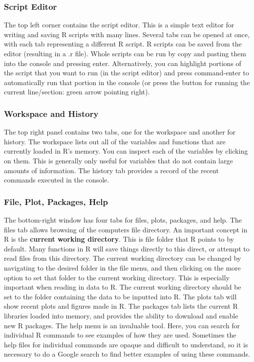 \documentclass[
]{book}
\begin{document}
\hypertarget{script-editor}{%
\subsubsection{Script Editor}\label{script-editor}}

The top left corner contains the script editor. This is a simple text editor for writing and saving R scripts with many lines. Several tabs can be opened at once, with each tab representing a different R script. R scripts can be saved from the editor (resulting in a .r file). Whole scripts can be run by copy and pasting them into the console and pressing enter. Alternatively, you can highlight portions of the script that you want to run (in the script editor) and press command-enter to automatically run that portion in the console (or press the button for running the current line/section: green arrow pointing right).

\hypertarget{workspace-and-history}{%
\subsubsection{Workspace and History}\label{workspace-and-history}}

The top right panel contains two tabs, one for the workspace and another for history. The workspace lists out all of the variables and functions that are currently loaded in R's memory. You can inspect each of the variables by clicking on them. This is generally only useful for variables that do not contain large amounts of information. The history tab provides a record of the recent commands executed in the console.

\hypertarget{file-plot-packages-help}{%
\subsubsection{File, Plot, Packages, Help}\label{file-plot-packages-help}}

The bottom-right window has four tabs for files, plots, packages, and help. The files tab allows browsing of the computers file directory. An important concept in R is the \textbf{current working directory}. This is file folder that R points to by default. Many functions in R will save things directly to this direct, or attempt to read files from this directory. The current working directory can be changed by navigating to the desired folder in the file menu, and then clicking on the more option to set that folder to the current working directory. This is especially important when reading in data to R. The current working directory should be set to the folder containing the data to be inputted into R. The plots tab will show recent plots and figures made in R. The packages tab lists the current R libraries loaded into memory, and provides the ability to download and enable new R packages. The help menu is an invaluable tool. Here, you can search for individual R commands to see examples of how they are used. Sometimes the help files for individual commands are opaque and difficult to understand, so it is necessary to do a Google search to find better examples of using these commands.
\end{document}
